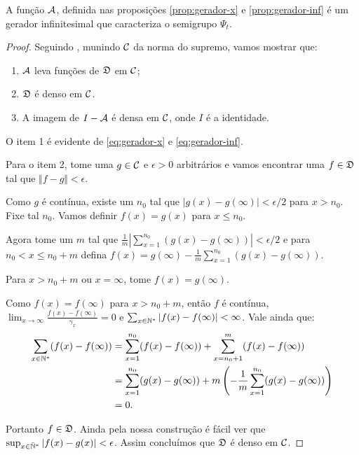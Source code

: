 \begin{teorema}
  A função ${\mathcal{A}}$, definida nas proposições \ref{prop:gerador-x} e
  \ref{prop:gerador-inf} é um gerador infinitesimal que caracteriza
  o semigrupo $\Psi_t$.
\end{teorema}
\begin{proof}
  Seguindo \cite{liggett:85}, munindo ${\mathcal{C}}$ da norma do supremo, vamos
  mostrar que:
  \begin{enumerate}
  \item ${\mathcal{A}}$ leva funções de ${\mathfrak{D}}$ em ${\mathcal{C}}$;
  \item ${\mathfrak{D}}$ é denso em ${\mathcal{C}}$.
  \item A imagem de $I - {\mathcal{A}}$ é densa em ${\mathcal{C}}$, onde $I$ é a identidade.
  \end{enumerate}

  O item 1 é evidente de \eqref{eq:gerador-x} e
  \eqref{eq:gerador-inf}.

  Para o item 2, tome uma $g \in {\mathcal{C}}$ e $\epsilon > 0$ arbitrários e
  vamos encontrar uma $f \in {\mathfrak{D}}$ tal que $\Vert f - g \Vert <
  \epsilon$.

  Como $g$ é contínua, existe um $n_0$ tal que $|g(x) - g(\infty)| <
  \epsilon/2$ para $x > n_0$. Fixe tal $n_0$. Vamos definir $f(x) =
  g(x)$ para $x \leq n_0$.

  Agora tome um $m$ tal que $ \frac{1}{m} |\sum_{x = 1}^{n_0} (g(x) -
  g(\infty))| < \epsilon/2$ e para $n_0 < x \leq n_0 + m$ defina $f(x) =
  g(\infty) -\frac{1}{m} \sum_{x = 1}^{n_0} (g(x) - g(\infty))$.

  Para $x > n_0 + m$ ou $x = \infty$, tome $f(x) = g(\infty)$.

  Como $f(x) = f(\infty)$ para $x > n_0 + m$, então $f$ é contínua,
  $\lim_{x \to \infty} \frac{f(x) - f(\infty)}{\gamma_x} = 0$ e 
  $\sum_{x \in {\mathbb{N^*}}} |f(x) - f(\infty)| < \infty$. Vale ainda que:
  \begin{align*}
    \sum_{x \in {\mathbb{N^*}}} (f(x) - f(\infty) )
    &= \sum_{x = 1}^{n_0} (f(x) - f(\infty)) + 
    \sum_{x = n_0 + 1}^m (f(x) - f(\infty)) \\
    &= \sum_{x = 1}^{n_0} (g(x) - g(\infty)) +
    m \left( - \frac{1}{m}  \sum_{x = 1}^{n_0} (g(x) - g(\infty))
    \right)\\
    &= 0.
  \end{align*}

  Portanto $f \in {\mathfrak{D}}$. Ainda pela nossa construção é fácil ver que
  $\sup_{x \in {\mathbb{\bar{N}^*}}} |f(x) - g(x)| < \epsilon$. Assim concluímos que
  ${\mathfrak{D}}$ é denso em ${\mathcal{C}}$.


\end{proof}
